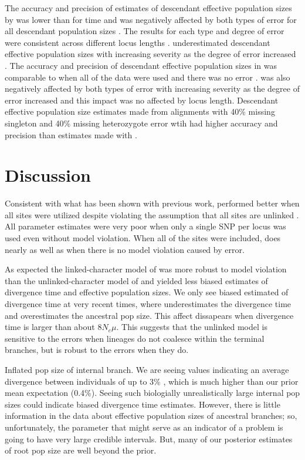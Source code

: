 The accuracy and precision of estimates of descendant effective population sizes 
by \beast was lower than for time and was negatively affected by both types
of error for all descendant population sizes \thetafigsp.
The results for each type and degree of error were consistent across different 
locus lengths \thetafigsp.
\beast underestimated descendant effective population sizes with increasing severity 
as the degree of error increased \thetafigsp.
The accuracy and precision of descendant effective population sizes in 
\ecoevolity was comparable to \beast when all of 
the data were used and there was no error \thetafigsp. 
\ecoevolity was also negatively affected
by both types of error with increasing severity as the degree of error increased
and this impact was no affected by locus length.
Descendant effective population size estimates made from alignments with 40\%
missing singleton and 40\% missing heterozygote error wtih \beast had higher
accuracy and precision than estimates made with \ecoevolity \thetafigsp.   

\section{Discussion}

Consistent with what has been shown with previous work, \ecoevolity performed 
better when all sites were utilized despite violating the assumption that all 
sites are unlinked \citep{Oaks2018ecoevolity}. All parameter estimates were very
poor when only a single SNP per locus was used even without model violation. 
When all of the sites were included, \ecoevolity does nearly as well as \beast 
when there is no model violation caused by error.

As expected the linked-character model of \ecoevolity was more robust to model 
violation than the unlinked-character model of \starbeast and yielded less biased 
estimates of divergence time and effective population sizes. 
We only see biased estimated of divergence time at very recent times, 
where \ecoevolity
underestimates the divergence time and overestimates the ancestral pop size.
This affect dissapears when divergence time is larger than about $8N_e\mu$.
This suggests that the unlinked model is sensitive to the errors
when lineages do not coalesce within the terminal branches,
but is robust to the errors when they do.

Inflated pop size of internal branch.
We are seeing values indicating an average divergence between individuals of up
to 3\% \rootfigs, which is much higher than our prior mean expectation (0.4\%).
Seeing such biologially unrealistically large internal pop sizes could indicate
biased divergence time estimates.
However, there is little information in the data about effective population sizes 
of ancestral branches; so, unfortunately, the parameter that might serve as an indicator
of a problem is going to have very large credible intervals.
But, many of our posterior estimates of root pop size are well beyond the
prior.

